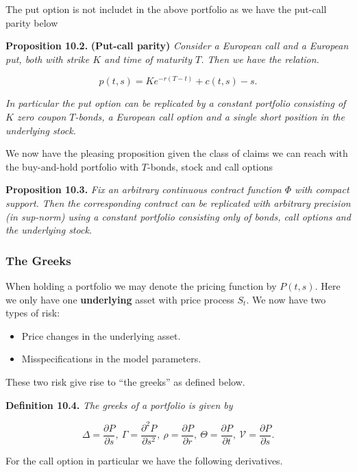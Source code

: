 \documentclass[
]{article}
\providecommand{\tightlist}{%
  \setlength{\itemsep}{0pt}\setlength{\parskip}{0pt}}
\begin{document}
The put option is not includet in the above portfolio as we have the
put-call parity below

\textbf{Proposition 10.2.} \textbf{(Put-call parity)} \emph{Consider a
European call and a European put, both with strike \(K\) and time of
maturity \(T\). Then we have the relation.}

\[
p(t,s) = Ke^{-r(T-t)}+c(t,s)-s.\tag{10.11}
\]

\emph{In particular the put option can be replicated by a constant
portfolio consisting of \(K\) zero coupon \(T\)-bonds, a European call
option and a single short position in the underlying stock.}

We now have the pleasing proposition given the class of claims we can
reach with the buy-and-hold portfolio with \(T\)-bonds, stock and call
options

\textbf{Proposition 10.3.} \emph{Fix an arbitrary continuous contract
function \(\Phi\) with compact support. Then the corresponding contract
can be replicated with arbitrary precision (in sup-norm) using a
constant portfolio consisting only of bonds, call options and the
underlying stock.}

\hypertarget{the-greeks}{%
\subsubsection{The Greeks}\label{the-greeks}}

When holding a portfolio we may denote the pricing function by
\(P(t,s)\). Here we only have one \textbf{underlying} asset with price
process \(S_t\). We now have two types of risk:

\begin{itemize}
\tightlist
\item
  Price changes in the underlying asset.
\item
  Misspecifications in the model parameters.
\end{itemize}

These two risk give rise to ``the greeks'' as defined below.

\textbf{Definition 10.4.} \emph{The greeks of a portfolio is given by}

\[
\Delta=\frac{\partial P}{\partial s},\ \Gamma=\frac{\partial^2 P}{\partial s^2},\ \rho=\frac{\partial P}{\partial r},\ \Theta=\frac{\partial P}{\partial t},\ \mathcal{V}=\frac{\partial P}{\partial s}.
\]

For the call option in particular we have the following derivatives.
\end{document}

